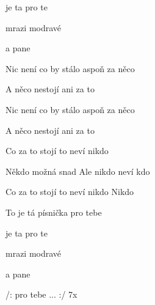 

\zs
{} je ta  pro te

 

mrazi  modravé  

 a pane
\ks

\zs
Nic není co by stálo aspoň za něco

A něco nestojí ani za to

Nic není co by stálo aspoň za něco

A něco nestojí ani za to
\ks

\zs
Co za to stojí to neví nikdo

Někdo možná snad Ale nikdo neví kdo

Co za to stojí to neví nikdo Nikdo

To je tá písnička pro tebe
\ks

\zs
{} je ta  pro te

 

mrazi  modravé  

 a pane
\ks

/: pro tebe ... :/ 7x

\kp






















